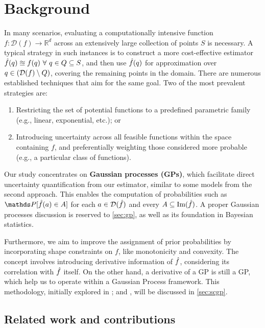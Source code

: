 \section{Background}
\label{sec:intro}

In many scenarios, evaluating a computationally intensive function  $f : \mathcal{D}(f) \to \mathbb{R}^d$ across an extensively large collection of points $S$ is necessary.
A typical strategy in such instances is to construct a more cost-effective estimator $\hat{f}(q) \approxeq f(q)\ \forall\ q\in Q \subseteq S$, and then use $\hat{f}(q)$ for approximation over  $q\in (\mathcal{D}(f) \setminus Q)$, covering the remaining points in the domain.
There are numerous established techniques that aim for the same goal. Two of the most prevalent strategies are:

\begin{enumerate}
\item Restricting the set of potential functions to a predefined parametric family (e.g., linear, exponential, etc.); or
\item Introducing uncertainty across all feasible functions within the space containing $f$, and preferentially weighting those considered more probable (e.g., a particular class of functions).
\end{enumerate}

Our study concentrates on \textbf{Gaussian processes (GPs)}, which facilitate direct uncertainty quantification from our estimator, similar to some models from the second approach.
This enables the computation of probabilities such as $\pr[\hf(a) \in A]$ for each $a \in \mathcal{D}(\hat{f})$ and every $A \subseteq \text{Im}(\hat{f})$.
A proper Gaussian processes discussion is reserved to \autoref{sec:gp}, as well as its foundation in Bayesian statistics.

Furthermore, we aim to improve the assignment of prior probabilities by incorporating shape constraints on $f$, like monotonicity and convexity. 
The concept involves introducing derivative information of $\hat{f}$, considering its correlation with $\hat{f}$ itself.
On the other hand, a derivative of a GP is still a GP, which help us to operate within a Gaussian Process framework.
This methodology, initially explored in           \citet{Rasmussen2005, Riihimaki2010}; and \cite{Berger2016}, will be discussed in \autoref{sec:scgp}.

\subsection{Related work and contributions}


